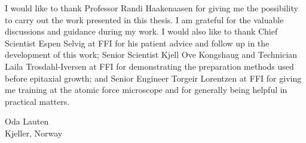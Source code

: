%
I would like to thank Professor Randi Haakenaasen for giving me the possibility to carry out the work presented in this thesis. I am grateful for the valuable discussions and guidance during my work. I would also like to thank Chief Scientist Espen Selvig at FFI for his patient advice and follow up in the development of this work; Senior Scientist Kjell Ove Kongshaug and Technician Laila Trosdahl-Iversen at FFI for demonstrating the preparation methods used before epitaxial growth; and Senior Engineer Torgeir Lorentzen at FFI for giving me training at the atomic force microscope and for generally being helpful in practical matters.
%
\vspace{1.0cm}
\begin{flushright}
    Oda Lauten      \\
    Kjeller, Norway \\
    \month~\year    \\
\end{flushright}
